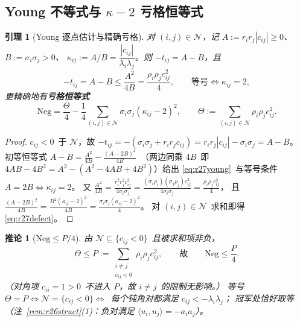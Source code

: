\documentclass[UTF8,11pt]{ctexart}
\newtheorem{lemma}[theorem]{引理}
\newtheorem{corollary}[theorem]{推论}
\theoremstyle{definition}
\begin{document}
\subsection{Young 不等式与 $\kappa-2$ 亏格恒等式}\label{sec:r27:young}

\begin{lemma}[Young 逐点估计与精确亏格]\label{lem:r27young}
对 $(i,j)\in\mathcal N$，记 $A:=r_ir_j|c_{ij}|\ge0$、$B:=\sigma_i\sigma_j>0$、
$\kappa_{ij}:=A/B=\dfrac{|c_{ij}|}{\lambda_i\lambda_j}$。则 $-t_{ij}=A-B$，且
\begin{equation}\label{eq:r27young}
-t_{ij}=A-B\le\frac{A^2}{4B}=\frac{\rho_i\rho_jc_{ij}^2}{4},
\qquad\text{等号}\iff\kappa_{ij}=2,
\end{equation}
更精确地有\textbf{亏格恒等式}
\begin{equation}\label{eq:r27defect}
\mathrm{Neg}=\frac\Theta4-\frac14\sum_{(i,j)\in\mathcal N}\sigma_i\sigma_j(\kappa_{ij}-2)^2,
\qquad
\Theta:=\sum_{(i,j)\in\mathcal N}\rho_i\rho_jc_{ij}^2 .
\end{equation}
\end{lemma}

\begin{proof}
$c_{ij}<0$~于 $\mathcal N$，故 $-t_{ij}=-(\sigma_i\sigma_j+r_ir_jc_{ij})=r_ir_j|c_{ij}|-\sigma_i\sigma_j=A-B$。
初等恒等式 $A-B=\frac{A^2}{4B}-\frac{(A-2B)^2}{4B}$~（两边同乘 $4B$~即
$4AB-4B^2=A^2-(A^2-4AB+4B^2)$）给出 \eqref{eq:r27young}~与等号条件 $A=2B\iff\kappa_{ij}=2$。
又 $\frac{A^2}{4B}=\frac{r_i^2r_j^2c_{ij}^2}{4\sigma_i\sigma_j}
=\frac{(\sigma_i\rho_i)(\sigma_j\rho_j)c_{ij}^2}{4\sigma_i\sigma_j}=\frac{\rho_i\rho_jc_{ij}^2}4$，
且 $\frac{(A-2B)^2}{4B}=\frac{B^2(\kappa_{ij}-2)^2}{4B}=\frac{\sigma_i\sigma_j(\kappa_{ij}-2)^2}4$。
对 $(i,j)\in\mathcal N$~求和即得 \eqref{eq:r27defect}。
\end{proof}

\begin{corollary}[$\mathrm{Neg}\le P/4$]\label{cor:r27P}
由 $\mathcal N\subseteq\{c_{ij}<0\}$~且被求和项非负，
\begin{equation}\label{eq:r27Pdef}
\Theta\le P:=\!\!\sum_{\substack{i\ne j\\ c_{ij}<0}}\!\!\rho_i\rho_jc_{ij}^2,
\qquad\text{故}\qquad
\mathrm{Neg}\le\frac P4 .
\end{equation}
（对角项 $c_{ii}=1>0$~不进入 $P$，故 $i\ne j$~的限制无影响。）
等号 $\Theta=P\iff\mathcal N=\{c_{ij}<0\}\iff$~每个钝角对都满足 $c_{ij}<-\lambda_i\lambda_j$；
冠军处恰好取等（注~\ref{rem:r26struct}(1)：负对满足 $\langle u_i,u_j\rangle=-a_ia_j$）。
\end{corollary}
\end{document}
